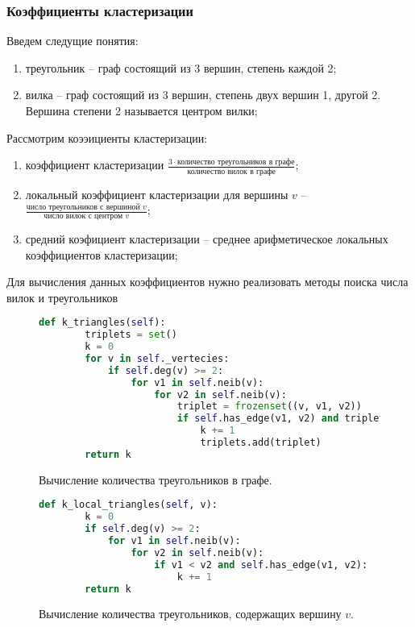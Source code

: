 \subsubsection{Коэффициенты кластеризации}
Введем следущие понятия:
\begin{enumerate}
    \item треугольник -- граф состоящий из 3 вершин, степень каждой 2;
    \item вилка -- граф состоящий из 3 вершин, степень двух вершин 1,
        другой 2. Вершина степени 2 называется центром вилки;
\end{enumerate}
Рассмотрим коээициенты кластеризации:
\begin{enumerate}
    \item коэффициент кластеризации $\frac{3 \cdot \text{количество треугольников в графе}}{\text{количество вилок в графе}}$;
     \item локальный коэффициент кластеризации для
         вершины $v$ --\\  $\frac{\text{число треугольников с вершиной~} v}{\text{число вилок с центром } v}$;
    \item средний коэфициент кластеризации -- среднее арифметическое 
        локальных коэффициентов кластеризации;
\end{enumerate}
Для вычисления данных коэффициентов нужно
реализовать методы поиска числа вилок и треугольников
\begin{figure}[H] 
\begin{lstlisting}[language=Python] 
    def k_triangles(self):
        triplets = set()
        k = 0
        for v in self._vertecies:
            if self.deg(v) >= 2:
                for v1 in self.neib(v):
                    for v2 in self.neib(v):
                        triplet = frozenset((v, v1, v2))
                        if self.has_edge(v1, v2) and triplet not in triplets:
                            k += 1
                            triplets.add(triplet)
        return k
\end{lstlisting}  
    \caption{Вычисление количества треугольников в графе.}
    \label{trg1}
\end{figure} 
\begin{figure}[H] 
\begin{lstlisting}[language=Python] 
    def k_local_triangles(self, v):
        k = 0
        if self.deg(v) >= 2:
            for v1 in self.neib(v):
                for v2 in self.neib(v):
                    if v1 < v2 and self.has_edge(v1, v2):
                        k += 1
        return k
\end{lstlisting}  
    \caption{Вычисление количества треугольников,
    содержащих вершину $v$.}
    \label{trg2}
\end{figure} 
